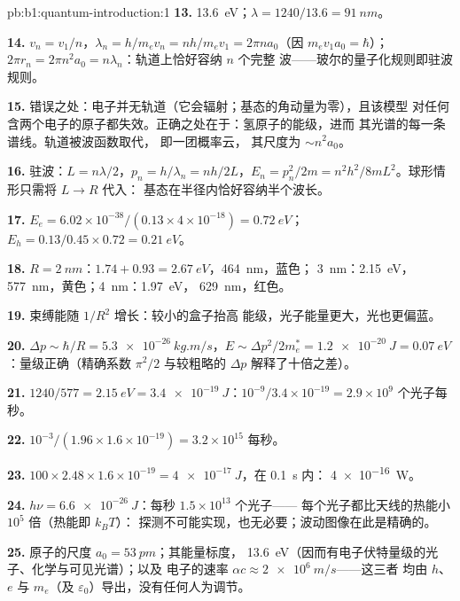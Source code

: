 \begin{solution}{pb:b1:quantum-introduction:1}
\textbf{13.} \qty{13.6}{eV}；$\lambda = 1240/13.6 = \qty{91}{nm}$。

\textbf{14.} $v_n = v_1/n$，$\lambda_n = h/m_ev_n = nh/m_ev_1 = 2\pi na_0$（因 $m_ev_1a_0
= \hbar$）；$2\pi r_n = 2\pi n^2a_0 = n\lambda_n$：轨道上恰好容纳 $n$ 个完整
波——玻尔的量子化规则即驻波规则。

\textbf{15.} 错误之处：电子并无轨道（它会辐射；基态的角动量为零），且该模型
对任何含两个电子的原子都失效。正确之处在于：氢原子的能级，进而
其光谱的每一条谱线。轨道被波函数取代，
即一团概率云，
其尺度为 $\sim n^2a_0$。

\textbf{16.} 驻波：$L = n\lambda/2$，$p_n = h/\lambda_n = nh/2L$，$E_n =
p_n^2/2m = n^2h^2/8mL^2$。球形情形只需将 $L \to R$ 代入：
基态在半径内恰好容纳半个波长。

\textbf{17.} $E_e = 6.02 \times 10^{-38}/(0.13 \times 4 \times 10^{-18}) = \qty{0.72}{eV}$；
$E_h = 0.13/0.45 \times 0.72 = \qty{0.21}{eV}$。

\textbf{18.} $R = \qty{2}{nm}$：$1.74 + 0.93 = \qty{2.67}{eV}$，\qty{464}{nm}，蓝色；
\qty{3}{nm}：\qty{2.15}{eV}，\qty{577}{nm}，黄色；\qty{4}{nm}：\qty{1.97}{eV}，
\qty{629}{nm}，红色。

\textbf{19.} 束缚能随 $1/R^2$ 增长：较小的盒子抬高
能级，光子能量更大，光也更偏蓝。

\textbf{20.} $\Delta p \sim \hbar/R = \qty{5.3e-26}{kg.m/s}$，$E \sim \Delta p^2/2m_e^\ast =
\qty{1.2e-20}{J} = \qty{0.07}{eV}$：量级正确（精确系数
$\pi^2/2$ 与较粗略的 $\Delta p$ 解释了十倍之差）。

\textbf{21.} $1240/577 = \qty{2.15}{eV} = \qty{3.4e-19}{J}$：$10^{-9}/3.4 \times 10^{-19}
= 2.9 \times 10^9$ 个光子每秒。

\textbf{22.} $10^{-3}/(1.96 \times 1.6 \times 10^{-19}) = 3.2 \times 10^{15}$ 每秒。

\textbf{23.} $100 \times 2.48 \times 1.6 \times 10^{-19} = \qty{4e-17}{J}$，在 \qty{0.1}{s} 内：
\qty{4e-16}{W}。

\textbf{24.} $h\nu = \qty{6.6e-26}{J}$：每秒 $1.5 \times 10^{13}$ 个光子——
每个光子都比天线的热能小 $10^5$ 倍（热能即 $k_BT$）：
探测不可能实现，也无必要；波动图像在此是精确的。

\textbf{25.} 原子的尺度 $a_0 = \qty{53}{pm}$；其能量标度，
\qty{13.6}{eV}（因而有电子伏特量级的光子、化学与可见光谱）；以及
电子的速率 $\alpha c \approx \qty{2e6}{m/s}$——这三者
均由 $h$、$e$ 与 $m_e$（及 $\varepsilon_0$）导出，没有任何人为调节。
\end{solution}
